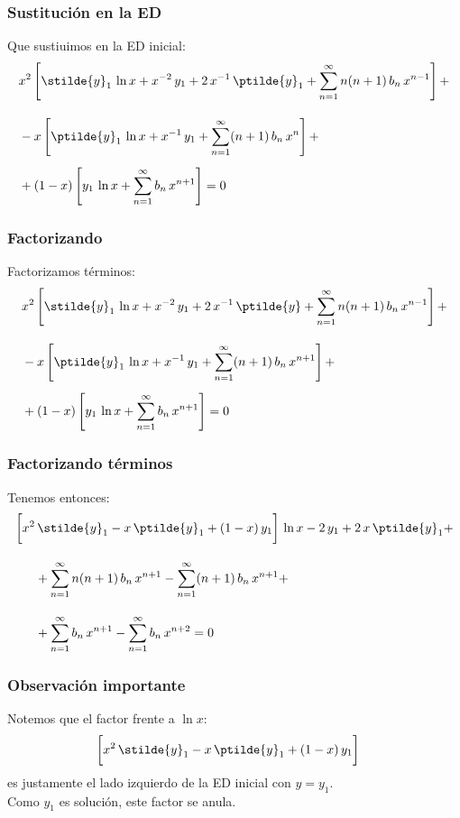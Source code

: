 \begin{frame}
\frametitle{Sustitución en la ED}
Que sustiuimos en la ED inicial:
\begin{align*}
&x^{2} \left[ \stilde{y}_{1} \, \ln x + x^{-2} \, y_{1} + 2 \, x^{-1} \, \ptilde{y}_{1} + \sum_{n=1}^{\infty} n (n + 1) \, b_{n} \, x^{n-1} \right] + \\[1em]
&- x \left[ \ptilde{y}_{1} \, \ln x + x^{-1} \, y_{1} + \sum_{n=1}^{\infty} (n + 1) \, b_{n} \, x^{n} \right] + \\[0.5em]
&+ (1 - x) \left[ y_{1} \, \ln x + \sum_{n=1}^{\infty} b_{n} \, x^{n+1} \right] = 0
\end{align*}
\end{frame}
\begin{frame}
\frametitle{Factorizando}
Factorizamos términos:
\fontsize{12}{12}\selectfont
\begin{align*}
&x^{2} \left[ \stilde{y}_{1} \, \ln x + x^{-2} \, y_{1} + 2 \, x^{-1} \, \ptilde{y} + \sum_{n=1}^{\infty} n (n + 1) \, b_{n} \, x^{n-1} \right] + \\[1em]
&- x \left[ \ptilde{y}_{1} \, \ln x + x^{-1} \, y_{1} + \sum_{n=1}^{\infty} (n + 1) \, b_{n} \, x^{n+1} \right] + \\[0.5em]
&+ (1 - x) \left[ y_{1} \, \ln x + \sum_{n=1}^{\infty} b_{n} \, x^{n+1} \right] = 0
\end{align*}
\end{frame}
\begin{frame}
\frametitle{Factorizando términos}
Tenemos entonces:
\begin{align*}
\bigg[ x^{2} &\, \stilde{y}_{1} - x \, \ptilde{y}_{1} + (1 - x) \, y_{1} \bigg] \, \ln x - 2 \, y_{1} +  2 \, x \, \ptilde{y}_{1} + \\[1em]
& + \sum_{n=1}^{\infty} n (n + 1) \, b_{n} \, x^{n+1} - \sum_{n=1}^{\infty} (n + 1) \, b_{n} \, x^{n+1} + \\[1em]
&+ \sum_{n=1}^{\infty} b_{n} \, x^{n+1} - \sum_{n=1}^{\infty} b_{n} \, x^{n+2} = 0
\end{align*} 
\end{frame}
\begin{frame}
\frametitle{Observación importante}
Notemos que el factor frente a $\ln x$:
\begin{align*}
\bigg[ x^{2} &\, \stilde{y}_{1} - x \, \ptilde{y}_{1} + (1 - x) \, y_{1} \bigg]
\end{align*}
es justamente el lado izquierdo de la ED inicial con $y = y_{1}$.
\\
\bigskip
Como $y_{1}$ es solución, este factor se anula.
\end{frame}
